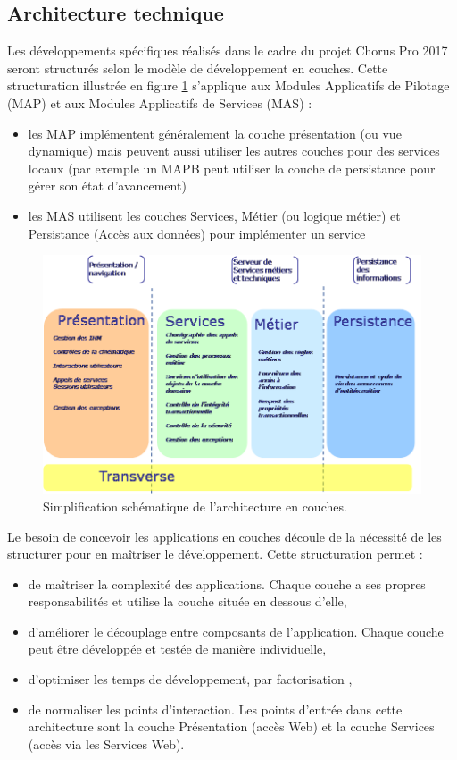 \documentclass[12pt,a4paper]{article}
\begin{document}
\subsection{Architecture technique}
Les développements spécifiques réalisés dans le cadre du projet Chorus Pro 2017 seront structurés selon le modèle de développement en couches. 
Cette structuration illustrée en figure \ref{couches} s’applique aux Modules Applicatifs de Pilotage (MAP) et aux Modules Applicatifs de Services (MAS) :
\begin{itemize}
\item	les MAP implémentent généralement la couche présentation (ou vue dynamique) mais peuvent aussi utiliser les autres couches pour des services locaux (par exemple un MAPB peut utiliser la couche de persistance pour gérer son état d'avancement)
\item	les MAS utilisent les couches Services, Métier (ou logique métier) et Persistance (Accès aux données) pour implémenter un service
\end{itemize}
\begin{figure}[H]
	\begin{center}
		\includegraphics[width=\textwidth, height=\textheight, keepaspectratio]{couchesModules.png}
		\caption{Simplification schématique de l'architecture en couches.}
		\label{couches}
	\end{center}
\end{figure}
\clearpage
\newpage
Le besoin de concevoir les applications en couches découle de la nécessité de les structurer pour en maîtriser le développement. Cette structuration permet :
\begin{itemize}
\item	de maîtriser la complexité des applications. Chaque couche a ses propres responsabilités et utilise la couche située en dessous d’elle,
\item	d’améliorer le découplage entre composants de l’application. Chaque couche peut être développée et testée de manière individuelle,
\item	d’optimiser les temps de développement, par factorisation ,
\item	de normaliser les points d’interaction. Les points d’entrée dans cette architecture sont la couche Présentation (accès Web) et la couche Services (accès via les Services Web).
\end{itemize}
\end{document}
